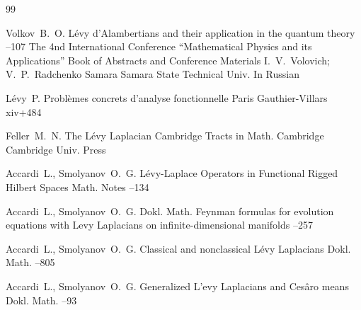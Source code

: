 \begin{thebibliography}{99}

\by  Volkov~B.~O.
\paper L\'{e}vy d'Alambertians and their application in the quantum theory
--107
\inbook  The 4nd International Conference ``Mathematical Physics and its Applications''
\bookinfo Book of Abstracts and Conference Materials
\eds I.~V.~Volovich; V.~P.~Radchenko
\publaddr Samara
\publ Samara State Technical Univ.
\lang In Russian



\by L\'evy~P. 
\book Probl\`emes concrets d'analyse fonctionnelle
\publaddr  Paris
\publ Gauthier-Villars
\totalpages xiv+484


\by  Feller~M.~N. 
\book The L\'evy Laplacian
\serial Cambridge Tracts in Math.
\publaddr  Cambridge  
\publ Cambridge Univ. Press 



\by  Accardi~L., Smolyanov~O.~G.
\paper L\'{e}vy-Laplace Operators in Functional Rigged Hilbert Spaces
\jour Math. Notes
--134



\by  Accardi~L., Smolyanov~O.~G.
\jour Dokl. Math.
\paper Feynman formulas for evolution equations with Levy Laplacians on infinite-dimensional manifolds
--257



\by  Accardi~L., Smolyanov~O.~G.
\paper Classical and nonclassical L\'evy Laplacians
\jour Dokl. Math.
--805



\by  Accardi~L.,  Smolyanov~O.~G.
\paper Generalized L'{e}vy Laplacians and Ces\^{a}ro means
\jour Dokl. Math.
--93




\end{thebibliography}
